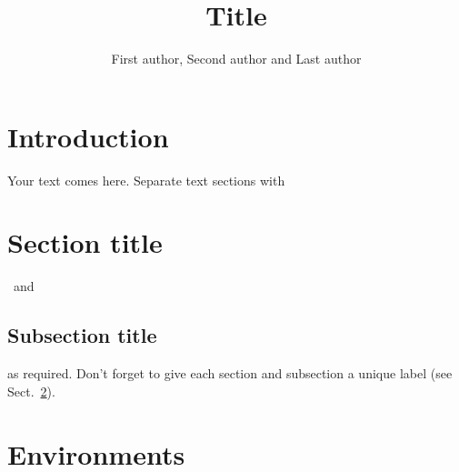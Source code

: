 \documentclass[dvips]{radhazu}
\begin{document}
\title[Running title]{Title}

\author[F. Author, S. Author and L. Author]{First author, Second author and Last author}
\address[First author]{Department of Mathematics\\University of Zagreb\\ 10 000 Zagreb, Croatia}

\address[Second author]{Department of Mathematics\\University of Zagreb\\ 10 000 Zagreb, Croatia}

\address[Last author]{Department of Mathematics\\University of Zagreb\\ 10 000 Zagreb, Croatia}









\maketitle

\section{Introduction}
\label{intro}

Your text comes here. Separate text sections with

\section{Section title}
\label{sec:1}
 \ and

\subsection{Subsection title}
\label{sec:2}

as required. Don't forget to give each section and subsection a
unique label (see Sect.~\ref{sec:1}).

\section{Environments}
\end{document}
